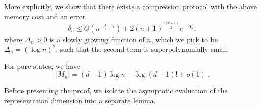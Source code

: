 \documentclass[a4paper,onecolumn,11pt]{quantumarticle}
\begin{document}
More explicitly, we show that there exists a compression protocol with the above memory cost and an error 
\begin{equation}
    \delta_n\le O(n^{-\frac14+\epsilon}) + 2(n+1)^{\frac{r(r+1)}{2}}e^{-\Delta_n},
\end{equation}
where $\Delta_n>0$ is a slowly growing function of $n$, which we pick to be $\Delta_n=(\log n)^2$, such that the second term is superpolynomially small.

For pure states, we have
\begin{equation}\label{eq:achievable_pure}
    |M_n|=(d-1)\log n -\log (d-1)!+ o(1)\ .
\end{equation}

Before presenting the proof, we isolate the asymptotic evaluation of the representation dimension into a separate lemma.
\end{document}
